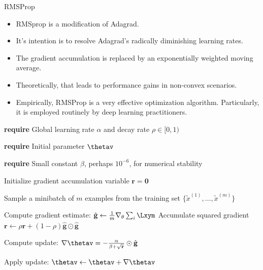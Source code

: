 \documentclass[11pt,compress,t,notes=noshow, xcolor=table]{beamer}
\begin{document}

\begin{vbframe}{RMSProp}
  \begin{itemize}
    \item RMSprop is a modification of Adagrad.
    \item It's intention is to resolve Adagrad's radically diminishing learning rates.
    \item The gradient accumulation is replaced by an exponentially weighted moving average.
    \item Theoretically, that leads to performance gains in non-convex scenarios.
    \item Empirically, RMSProp is a very effective optimization algorithm. Particularly, it is employed routinely by deep learning practitioners.
  \end{itemize}
  
\framebreak
  
  
  \begin{algorithm}[H]
    \small
    \caption{RMSProp}
    \begin{algorithmic}[1]
    \State \textbf{require} Global learning rate $\alpha$ and decay rate $\rho \in [0, 1)$ \strut
    \State \textbf{require} Initial parameter $\mathbf{\thetav}$ \strut
    \State \parbox[t]{\dimexpr\linewidth-\algorithmicindent}{\textbf{require} Small constant $\beta$, perhaps $10^{-6}$, for numerical stability \strut}
    \State Initialize gradient accumulation variable $\mathbf{r} = \mathbf{0} $
        \State \parbox[t]{\dimexpr\linewidth-\algorithmicindent}{Sample a minibatch of $m$ examples from the training set $\{\tilde{x}^{(1)},\dots,\tilde{x}^{(m)}\}$ \strut}
        \State Compute gradient estimate: $\hat{\mathbf{g}} \leftarrow \frac{1}{m} \nabla_\theta \sum_{i} \Lxym$
        \State Accumulate squared gradient $\mathbf{r} \leftarrow \rho \mathbf{r} + (1 - \rho) \hat{\mathbf{g}} \odot  \hat{\mathbf{g}}$
        \State \parbox[t]{\dimexpr\linewidth-\algorithmicindent}{Compute update: $\nabla\mathbf{\thetav} = - \frac{\alpha}{\beta + \sqrt\mathbf{r}} \odot \hat{\mathbf{g}}$ \strut}
        \State Apply update: $\mathbf{\thetav} \leftarrow \mathbf{\thetav} + \nabla\mathbf{\thetav}$
      \EndWhile
    \end{algorithmic}
  \end{algorithm}
\end{vbframe}
\end{document}
